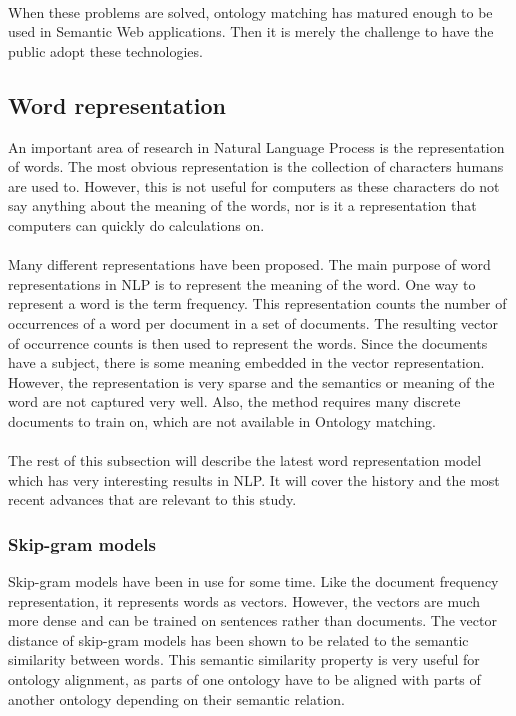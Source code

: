 \documentclass{article}
\begin{document}
 \paragraph{}
 When these problems are solved, ontology matching has matured enough to be used in Semantic Web applications. Then it is merely the challenge to have the public adopt these technologies.
 
 \subsection{Word representation} \label{w2v}
 An important area of research in Natural Language Process is the representation of words. The most obvious representation is the collection of characters humans are used to. However, this is not useful for computers as these characters do not say anything about the meaning of the words, nor is it a representation that computers can quickly do calculations on.
 \paragraph{}
 Many different representations have been proposed. The main purpose of word representations in NLP is to represent the meaning of the word. One way to represent a word is the term frequency. This representation counts the number of occurrences of a word per document in a set of documents. The resulting vector of occurrence counts is then used to represent the words. Since the documents have a subject, there is some meaning embedded in the vector representation. However, the representation is very sparse and the semantics or meaning of the word are not captured very well. Also, the method requires many discrete documents to train on, which are not available in Ontology matching.
 \paragraph{}
 The rest of this subsection will describe the latest word representation model which has very interesting results in NLP. It will cover the history and the most recent advances that are relevant to this study.
 
 \subsubsection{Skip-gram models}
 Skip-gram models have been in use for some time. Like the document frequency representation, it represents words as vectors. However, the vectors are much more dense and can be trained on sentences rather than documents. The vector distance of skip-gram models has been shown to be related to the semantic similarity between words. This semantic similarity property is very useful for ontology alignment, as parts of one ontology have to be aligned with parts of another ontology depending on their semantic relation.
\end{document}
